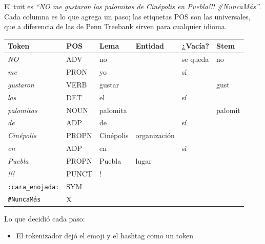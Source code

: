 \documentclass[11pt,letterpaper]{article}
\begin{document}
\begin{ejemplo}
    \label{fa28-tuit}
    El tuit es \textit{``NO me gustaron las palomitas de Cinépolis en
    Puebla!!!} 
    \textit{\#NuncaMás''}. Cada columna es lo que agrega un paso; las
    etiquetas POS son las universales, que a diferencia de las de Penn
    Treebank sirven para cualquier idioma.
    \begin{center}
    \small
    \begin{tabular}{llllll}
        \toprule
        \textbf{Token} & \textbf{POS} & \textbf{Lema}
            & \textbf{Entidad} & \textbf{¿Vacía?}
            & \textbf{Stem} \\
        \midrule
        \textit{NO}        & ADV   & no       & & se queda & no \\
        \textit{me}        & PRON  & yo       & & sí & \\
        \textit{gustaron}  & VERB  & gustar   & & & gust \\
        \textit{las}       & DET   & el       & & sí & \\
        \textit{palomitas} & NOUN  & palomita & & & palomit \\
        \textit{de}        & ADP   & de       & & sí & \\
        \textit{Cinépolis} & PROPN & Cinépolis & organización & & \\
        \textit{en}        & ADP   & en       & & sí & \\
        \textit{Puebla}    & PROPN & Puebla   & lugar & & \\
        \textit{!!!}       & PUNCT & !        & & & \\
        \texttt{:cara\_enojada:} & SYM & & & & \\
        \texttt{\#NuncaMás}      & X   & & & & \\
        \bottomrule
    \end{tabular}
    \end{center}
    Lo que decidió cada paso:
    \begin{itemize}[itemsep=0.2em]
        \item El tokenizador dejó el emoji y el hashtag como un token

\end{itemize}
\end{ejemplo}
\end{document}
